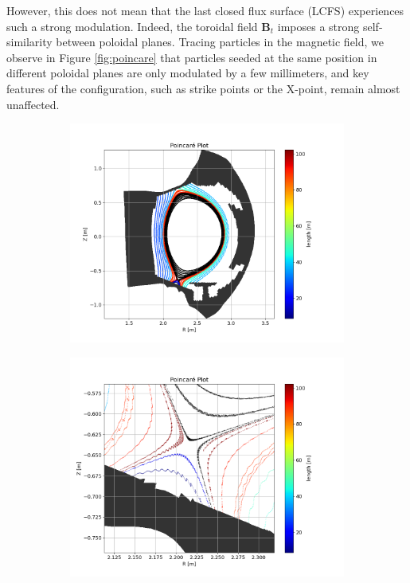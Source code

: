 However, this does not mean that the last closed flux surface (LCFS) experiences such a strong modulation. Indeed, the toroidal field $\textbf{B}_t$ imposes a strong self-similarity between poloidal planes. Tracing particles in the magnetic field, we observe in Figure \ref{fig:poincare} that particles seeded at the same position in different poloidal planes are only modulated by a few millimeters, and key features of the configuration, such as strike points or the X-point, remain almost unaffected. \newline

\begin{figure}[H]\centering
	\begin{subfigure}[t]{0.49\textwidth}
		\centering
		\includegraphics[width=1\textwidth]{schemes/WESTpoincareFull.png}
		\label{fig:poincareFull}
	\end{subfigure}
	\begin{subfigure}[t]{0.49\textwidth}
		\centering
		\includegraphics[width=1\textwidth]{schemes/WESTpoincareXpt.png}

\end{subfigure}
\end{figure}

